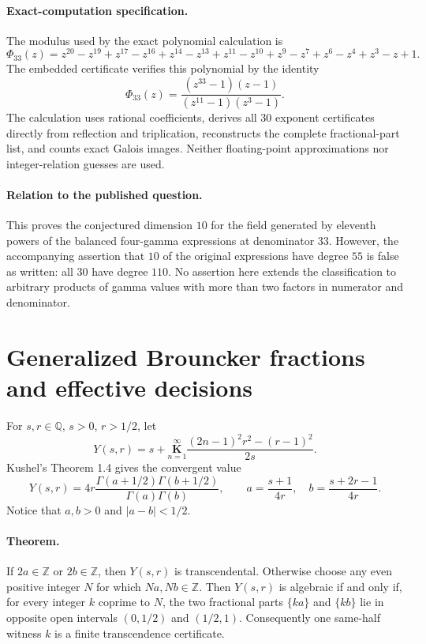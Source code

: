 \documentclass[11pt,a4paper]{article}
\theoremstyle{definition}
\theoremstyle{remark}
\numberwithin{equation}{section}
\begin{document}
\paragraph{Exact-computation specification.}
The modulus used by the exact polynomial calculation is
\[
 \Phi_{33}(z)=z^{20}-z^{19}+z^{17}-z^{16}+z^{14}-z^{13}
 +z^{11}-z^{10}+z^9-z^7+z^6-z^4+z^3-z+1.
\]
The embedded certificate verifies this polynomial by the identity
\[
 \Phi_{33}(z)=\frac{(z^{33}-1)(z-1)}{(z^{11}-1)(z^3-1)}.
\]
The calculation uses rational coefficients, derives all $30$ exponent
certificates directly from reflection and triplication, reconstructs
the complete fractional-part list, and counts exact Galois images.  Neither floating-point approximations nor
integer-relation guesses are used.

\paragraph{Relation to the published question.}
This proves the conjectured dimension $10$ for the field generated by
eleventh powers of the balanced four-gamma expressions at denominator
$33$.  However, the accompanying assertion that $10$ of the original
expressions have degree $55$ is false as written: all $30$ have degree
$110$.  No assertion here extends the classification to arbitrary
products of gamma values with more than two factors in numerator and
denominator.


\section{Generalized Brouncker fractions and effective decisions}\label{fields-sec-brouncker}

For $s,r\in\mathbb Q$, $s>0$, $r>1/2$, let
\[
 Y(s,r)=s+\underset{n=1}{\overset{\infty}{\mathbf K}}
 \frac{(2n-1)^2r^2-(r-1)^2}{2s}.
\]
Kushel's Theorem 1.4 \cite{fields-Kushel} gives the convergent value
\begin{equation}\label{fields-eq:brouncker-gamma}
 Y(s,r)=4r\frac{\Gamma(a+1/2)\Gamma(b+1/2)}{\Gamma(a)\Gamma(b)},
 \qquad a=\frac{s+1}{4r},\quad b=\frac{s+2r-1}{4r}.
\end{equation}
Notice that $a,b>0$ and $|a-b|<1/2$.

\paragraph{Theorem.}
If $2a\in\mathbb Z$ or $2b\in\mathbb Z$, then $Y(s,r)$ is
transcendental. Otherwise choose any even positive integer $N$ for which
$Na,Nb\in\mathbb Z$. Then $Y(s,r)$ is algebraic if and only if, for
every integer $k$ coprime to $N$, the two fractional parts $\{ka\}$
and $\{kb\}$ lie in opposite open intervals $(0,1/2)$ and $(1/2,1)$.
Consequently one same-half witness $k$ is a finite transcendence certificate.
\end{document}
